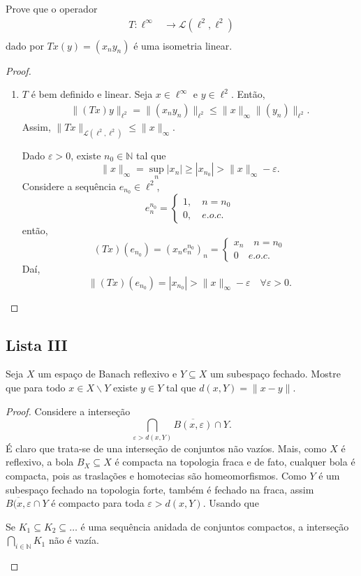 \documentclass[portuguese]{article}
\theoremstyle{definition}
\newcommand{\N}{\mathbb{N}}
\begin{document}
	\begin{exer*}[36.29, Botelho]
		Prove que o operador
		\begin{align*}
			T:\ell^\infty&\to\mathcal{L}(\ell^2,\ell^2)\\
		\end{align*}
		dado por $Tx(y)=(x_ny_n)$ é uma isometria linear.
	\end{exer*}
	\begin{proof}
		\begin{enumerate}
			\item $T$ é bem definido e linear. Seja $x\in\ell^\infty$ e $y\in \ell^2$. Então,
			\begin{align*}
				\| (Tx)y\|_{\ell^2}=\|(x_ny_n)\|_{\ell^2}\leq\| x\|_\infty\|(y_n)\|_{\ell^2}.
			\end{align*}
			Assim, $\| Tx\|_{\mathcal{L}(\ell^2,\ell^2)}\leq\| x\|_\infty$.
			
			Dado $\varepsilon>0$, existe $n_0\in\N$ tal que
			\[\| x\|_\infty=\sup_n|x_n|\geq|x_{n_0}|>\| x\|_\infty-\varepsilon.\]
			Considere a sequência $e_{n_0}\in\ell^2$,
			\[e^{n_0}_n=\begin{cases}
				1,\quad n=n_0\\
				0,\quad e.o.c.
			\end{cases}\]
			então,
			\[(Tx)(e_{n_0})=(x_ne_n^{n_0})_n=\begin{cases}
				x_n\quad n=n_0\\
				0\quad e.o.c.
			\end{cases}\]
			Daí,
			\[\| (Tx)(e_{n_0})=|x_{n_0}|>\| x\|_\infty-\varepsilon\quad\forall\varepsilon>0.\]
		\end{enumerate}
	\end{proof}
	
	\subsection{Lista III}
	\begin{exer*}[6]
		Seja $X$ um espaço de Banach reflexivo e $Y\subseteq X$ um subespaço fechado. Mostre que para todo $x\in X\backslash Y$ existe $y\in Y$ tal que $d(x,Y)=\| x-y\|$.
	\end{exer*}
	\begin{proof}
		Considere a interseção
		\[\bigcap_{\varepsilon>d(x,Y)}\overline{B(x,\varepsilon)}\cap Y.\]
		É claro que trata-se de una interseção de conjuntos não vazíos. Mais, como $X$ é reflexivo, a bola $B_X\subseteq X$ é compacta na topologia fraca e de fato, cualquer bola é compacta, pois as traslações e homotecias são homeomorfismos. Como $Y$ é um subespaço fechado na topologia forte, também é fechado na fraca, assim $\overline{B(x,\varepsilon}\cap Y$ é compacto para toda $\varepsilon>d(x,Y)$. Usando que
		\begin{prop}
			Se $K_1\subseteq K_2\subseteq \ldots$ é uma sequência anidada de conjuntos compactos, a interseção $\bigcap_{i\in\N}K_1$ não é vazía.
		\end{prop}
	\end{proof}
	\fi
\end{document}
